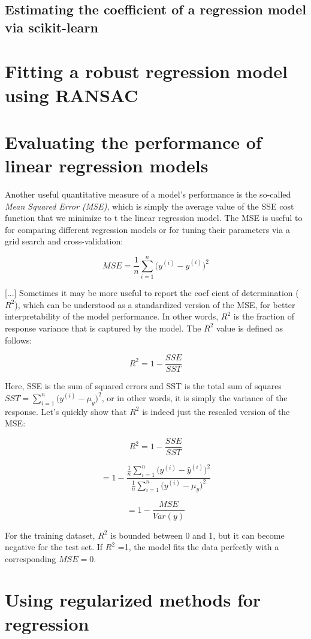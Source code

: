 \documentclass[letterpaper]{report}
\begin{document}
\subsection{Estimating the coefficient of a regression model via scikit-learn}
\section{Fitting a robust regression model using RANSAC}
\section{Evaluating the performance of linear regression models}

Another useful quantitative measure of a model's performance is the so-called \textit{Mean Squared Error (MSE)}, which is simply the average value of the SSE cost function that we minimize to  t the linear regression model. The MSE is useful to for comparing different regression models or for tuning their parameters via a grid search and cross-validation:

\[
MSE = \frac{1}{n} \sum_{i=1}^{n} \big( y^{(i)} - \hat{y}^{(i)}  \big)^2
\]

[...] Sometimes it may be more useful to report the coef cient of determination ($R^2$), which can be understood as a standardized version of the MSE, for better interpretability of the model performance. In other words, $R^2$ is the fraction of response variance that is captured by the model. The $R^2$ value is defined as follows:

\[
R^2 = 1 - \frac{SSE}{SST}
\]

Here, SSE is the sum of squared errors and SST is the total sum of squares $SST = \sum^{n}_{i=1} \big( y^{(i)} - \mu_y \big)^2$, or in other words, it is simply the variance of the response. Let's quickly show that $R^2$ is indeed just the rescaled version of the MSE:

\[
R^2 = 1 - \frac{SSE}{SST}
\]

\[
= 1 - \frac{\frac{1}{n} \sum^{n}_{i=1} \big( y^{(i)} - \hat{y}^{(i)}  \big)^2 }{\frac{1}{n} \sum_{i=1}^{n} \big( y^{(i)} - \mu_y \big)^2 }
\]
 
\[
= 1 - \frac{MSE}{Var(y)}
\]

For the training dataset, $R^2$ is bounded between 0 and 1, but it can become negative for the test set. If $R^2$ =1, the model  fits the data perfectly with a
corresponding $MSE = 0$.

\section{Using regularized methods for regression}
\end{document}
